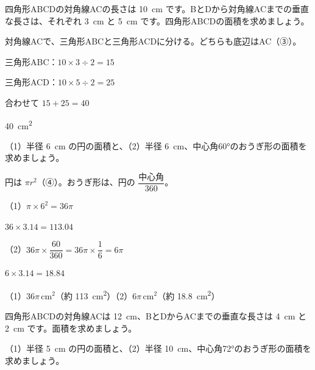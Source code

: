 \begin{reidai}[四角形を三角形に分ける]
四角形ABCDの対角線ACの長さは \qty{10}{cm} です。BとDから対角線ACまでの垂直な長さは、それぞれ \qty{3}{cm} と \qty{5}{cm} です。四角形ABCDの面積を求めましょう。\par
\kangaekata 対角線ACで、三角形ABCと三角形ACDに分ける。どちらも底辺はAC（③）。\par
\shiki 三角形ABC：$10\times3\div2=15$\par
\hspace*{2.6\zw}三角形ACD：$10\times5\div2=25$\par
\hspace*{2.6\zw}合わせて $15+25=40$\par
\kotae \qty{40}{cm^2}
\end{reidai}

\begin{reidai}[円とおうぎ形の面積]
（1）半径 \qty{6}{cm} の円の面積と、（2）半径 \qty{6}{cm}、中心角60°のおうぎ形の面積を求めましょう。\par
\kangaekata 円は $\pi r^2$（④）。おうぎ形は、円の $\dfrac{\text{中心角}}{360}$。\par
\shiki（1）$\pi\times6^2=36\pi$\par
\hspace*{4.6\zw}$36\times3.14=113.04$\par
\hspace*{2.6\zw}（2）$36\pi\times\dfrac{60}{360}=36\pi\times\dfrac{1}{6}=6\pi$\par
\hspace*{4.6\zw}$6\times3.14=18.84$\par
\kotae（1）$36\pi$\,cm$^2$（約 \qty{113}{cm^2}）\quad（2）$6\pi$\,cm$^2$（約 \qty{18.8}{cm^2}）
\end{reidai}

\noindent\begin{minipage}[t]{0.485\linewidth}\vspace{0pt}\raggedright
\begin{jibun}\raggedright
四角形ABCDの対角線ACは \qty{12}{cm}、BとDからACまでの垂直な長さは \qty{4}{cm} と \qty{2}{cm} です。面積を求めましょう。
\end{jibun}
\end{minipage}\hfill
\begin{minipage}[t]{0.485\linewidth}\vspace{0pt}\raggedright
\begin{jibun}\raggedright
（1）半径 \qty{5}{cm} の円の面積と、（2）半径 \qty{10}{cm}、中心角72°のおうぎ形の面積を求めましょう。
\end{jibun}
\end{minipage}

